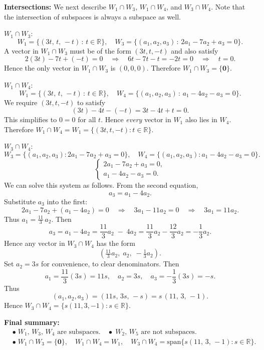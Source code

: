 \documentclass{article}
\begin{document}
\bigskip

\noindent
\textbf{Intersections:} We next describe $W_1\cap W_3$, $W_1\cap W_4$, and $W_3\cap W_4$. Note that the intersection of subspaces is always a subspace as well.

\medskip
\noindent
$W_1 \cap W_3$:
\[
W_1 = \{(3t,\, t,\, -t)\,:\, t\in \mathbb{R}\}, 
\quad
W_3 = \{(a_1,a_2,a_3)\,:\, 2a_1 -7a_2 + a_3 = 0\}.
\]
A vector in $W_1 \cap W_3$ must be of the form $(3t, t, -t)$ and also satisfy
\[
2(3t) - 7t + (-t) = 0
\quad \Longrightarrow \quad 6t - 7t - t = -2t = 0
\quad \Longrightarrow \quad t=0.
\]
Hence the only vector in $W_1 \cap W_3$ is $(0,0,0)$. Therefore $W_1 \cap W_3 = \{\mathbf{0}\}$.

\medskip
\noindent
$W_1 \cap W_4$:
\[
W_1 = \{(3t,\, t,\, -t)\,:\, t\in \mathbb{R}\}, 
\quad
W_4 = \{(a_1,a_2,a_3)\,:\, a_1 -4a_2 - a_3 = 0\}.
\]
We require $(3t, t, -t)$ to satisfy
\[
(3t) - 4t - (-t) = 3t - 4t + t = 0.
\]
This simplifies to $0=0$ for all $t$. Hence \emph{every} vector in $W_1$ also lies in $W_4$. Therefore $W_1 \cap W_4 = W_1 = \{(3t, t, -t) : t \in \mathbb{R}\}$.

\medskip
\noindent
$W_3 \cap W_4$:
\[
W_3 = \{(a_1,a_2,a_3) : 2a_1 - 7a_2 + a_3 = 0\}, 
\quad
W_4 = \{(a_1,a_2,a_3) : a_1 - 4a_2 - a_3 = 0\}.
\]
\[
\begin{cases}
2a_1 - 7a_2 + a_3 = 0,\\
a_1 - 4a_2 - a_3 = 0.
\end{cases}
\]
We can solve this system as follows. From the second equation,
\[
a_3 = a_1 - 4a_2.
\]
Substitute $a_3$ into the first:
\[
2a_1 - 7a_2 + (a_1 - 4a_2) = 0 
\quad \Longrightarrow \quad 3a_1 - 11a_2 = 0 
\quad \Longrightarrow \quad 3a_1 = 11a_2.
\]
Thus $a_1 = \tfrac{11}{3}\,a_2$. Then
\[
a_3 = a_1 - 4a_2 = \frac{11}{3}a_2 \;-\; 4a_2 
= \frac{11}{3}a_2 - \frac{12}{3}a_2 
= -\frac{1}{3}a_2.
\]
Hence any vector in $W_3 \cap W_4$ has the form
\[
\left(\tfrac{11}{3}a_2,\; a_2,\; -\tfrac{1}{3}a_2\right).
\]
Set $a_2 = 3s$ for convenience, to clear denominators. Then
\[
a_1 = \frac{11}{3}(3s) = 11s,\quad
a_2 = 3s,\quad
a_3 = -\frac{1}{3}(3s) = -s.
\]
Thus
\[
(a_1, a_2, a_3) = (11s,\,3s,\,-s) = s\,(11,\,3,\,-1).
\]
Hence $W_3 \cap W_4 = \{ s(11,3,-1) : s \in \mathbb{R}\}$.

\bigskip

\noindent
\textbf{Final summary:}
\[
\begin{aligned}
&\bullet\; W_1,\,W_3,\,W_4 \text{ are subspaces.}
\quad\bullet\; W_2,\,W_5 \text{ are not subspaces.} \\[6pt]
&\bullet\; W_1 \cap W_3 = \{\mathbf{0}\}, 
\quad 
W_1 \cap W_4 = W_1, 
\quad 
W_3 \cap W_4 = \text{span}\{s(11,\,3,\, -1): s \in \mathbb{R}\}.
\end{aligned}
\]
\end{document}
